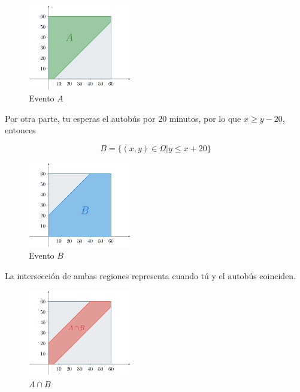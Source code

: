 \begin{figure}[H] 
    \centering 
    \includegraphics[width=0.4\textwidth]{1 Introducción/1.1 Tipos de probabilidad/1.1 Imágenes/Probabilidad geometrica 3.png}
    \caption{Evento $A$}
\end{figure}

\noindent Por otra parte, tu esperas el autobús por 20 minutos, por lo que $x \geq y-20$, entonces

\begin{equation*}
    B = \{(x,y) \in \Omega | y \leq x+20\}
\end{equation*}

\begin{figure}[H] 
    \centering 
    \includegraphics[width=0.4\textwidth]{1 Introducción/1.1 Tipos de probabilidad/1.1 Imágenes/Probabilidad geometrica 4.png}
    \caption{Evento $B$}
\end{figure}

\noindent La intersección de ambas regiones representa cuando tú y el autobús coinciden.

\begin{figure}[H] 
    \centering 
    \includegraphics[width=0.4\textwidth]{1 Introducción/1.1 Tipos de probabilidad/1.1 Imágenes/Probabilidad geometrica 5.png}
    \caption{$A \cap B$}
\end{figure}


